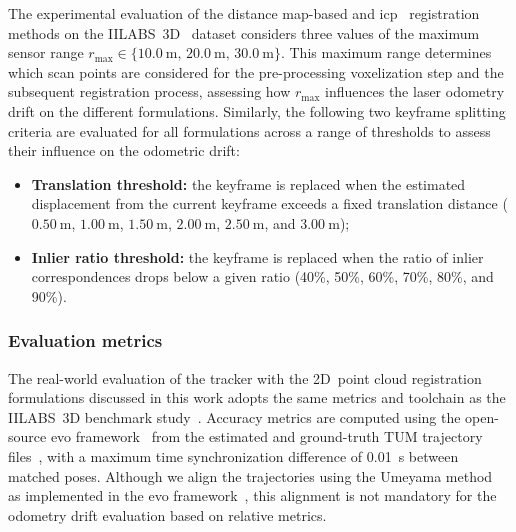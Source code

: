The experimental evaluation of the distance map-based and
\gls{icp}~\cite{besl-mckay:tpami:1992,chen-medioni:icra:1991} registration
methods on the IILABS~3D~\cite{ribeiro:access:2025} dataset considers three
values of the maximum sensor range
$r_\mathrm{max} \in \{\SI{10.0}{\metre},\,\SI{20.0}{\metre},\,\SI{30.0}{\metre}\}$.
This maximum range determines which scan points are considered for the
pre-processing voxelization step and the subsequent registration process,
assessing how $r_\mathrm{max}$ influences the laser odometry drift on the
different formulations.
Similarly, the following two keyframe splitting criteria are evaluated for all
formulations across a range of thresholds to assess their influence on the
odometric drift:
\begin{itemize}
\item \textbf{Translation threshold:} the keyframe is replaced when the
      estimated displacement from the current keyframe exceeds
      a fixed translation distance
      ($\SI{0.50}{\metre}$, $\SI{1.00}{\metre}$, $\SI{1.50}{\metre}$,
      $\SI{2.00}{\metre}$, $\SI{2.50}{\metre}$, and $\SI{3.00}{\metre}$);
\item \textbf{Inlier ratio threshold:} the keyframe is replaced when
      the ratio of inlier correspondences
      drops below a given ratio
      (40\%, 50\%, 60\%, 70\%, 80\%, and 90\%).
\end{itemize}

\subsubsection{Evaluation metrics}
\label{sec:distance-maps:results:iilabs3d:metrics}

The real-world evaluation of the tracker with the 2D~point cloud registration
formulations discussed in this work adopts the same metrics and toolchain as
the IILABS~3D benchmark study~\cite{ribeiro:access:2025}.
Accuracy metrics are computed using the open-source evo
framework~\cite{grupp:evo} from the estimated and ground-truth
TUM trajectory files~\cite{sturm:iros:2012}, with a maximum
time synchronization difference of \SI{0.01}{\second} between matched poses.
Although we align the trajectories using the Umeyama
method~\cite{umeyama:tpami:1991} as implemented in the evo
framework~\cite{grupp:evo}, this alignment is not mandatory for
the odometry drift evaluation based on relative metrics.

